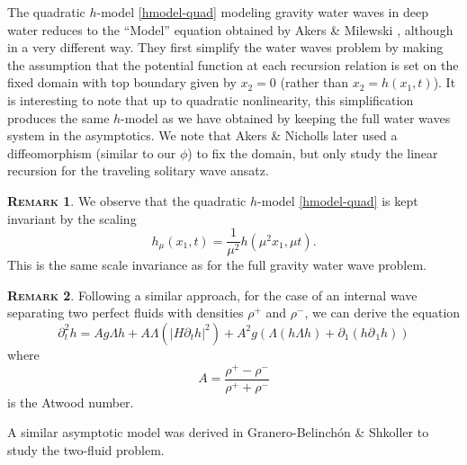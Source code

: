 \documentclass[11pt]{article}
\theoremstyle{plain}
\theoremstyle{definition}
\newtheorem{remark}{\scshape Remark}
\theoremstyle{definition}
\def\p{\text{\bf\emph{p}}}
\def\p{{\partial\hspace{1pt}}}
\begin{document}
The quadratic $h$-model \eqref{hmodel-quad} modeling gravity water waves in deep water reduces to the ``Model'' equation obtained by Akers \& Milewski \cite{AkMi2010}, although in a very different way.   They first simplify the water waves problem
by making the assumption that the potential function at each recursion relation is set on the fixed domain with top boundary  given by
$x_2=0$ (rather than $x_2= h(x_1,t)$).  It is interesting to note that up to quadratic nonlinearity, this simplification produces the same $h$-model as we have obtained
by keeping the full water waves system in the asymptotics.  We note that
Akers \& Nicholls \cite{AkNi2010} later used a diffeomorphism (similar to our $\phi$) to fix the domain,  but only study the linear recursion for the traveling solitary wave
ansatz.

\begin{remark}
We observe that the quadratic $h$-model \eqref{hmodel-quad} is kept invariant by the scaling
$$
h_{\mu}(x_1,t)=\frac{1}{\mu^2}h(\mu^2 x_1,\mu t).
$$
This is the same scale invariance as for the full gravity water wave problem.
\end{remark}

\begin{remark}\label{remark}
Following a similar approach, for the case of an internal wave separating two perfect fluids with densities $\rho^+$ and $\rho^-$, we can derive the equation
\begin{equation}\label{waveeq}
\partial_t^2 h=Ag\Lambda h+A\Lambda(|H \partial_t h|^2)+A^2g \left(\Lambda(h\Lambda h)+ \partial_1 (h\p_{\!1} h)\right)
\end{equation}
where
$$
A= \frac{\rho^+ - \rho^-}{\rho^+ + \rho^-}
$$
is the Atwood number.
\end{remark}
A similar asymptotic model was derived in Granero-Belinch\'{o}n \& Shkoller \cite{GrSh2017} to study the two-fluid problem.
\end{document}
